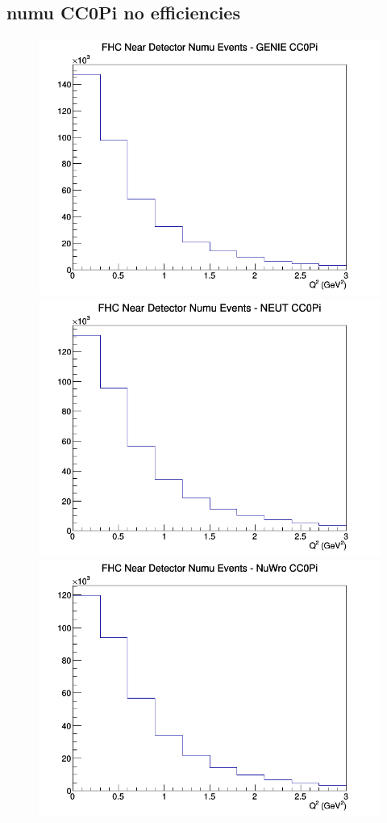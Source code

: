 \documentclass[12pt]{article}
\begin{document}
\subsection{numu CC0Pi no efficiencies}
\begin{figure}[h]
\includegraphics[width=\linewidth]{Q2/nominal/CC0Pi_FHC_ND_numu_Q2_GENIE.png}
\endminipage
{}
\includegraphics[width=\linewidth]{Q2/nominal/CC0Pi_FHC_ND_numu_Q2_NEUT.png}
\endminipage
{}
\includegraphics[width=\linewidth]{Q2/nominal/CC0Pi_FHC_ND_numu_Q2_NuWro.png}

\end{figure}
\end{document}
